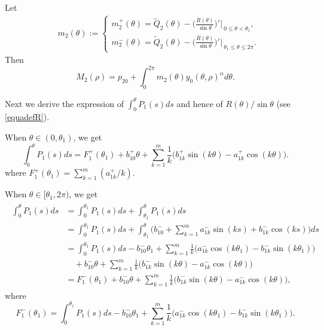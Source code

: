 \documentclass[11pt]{amsart}
\theoremstyle{remark}
\theoremstyle{definition}
\begin{document}
Let  \begin{align}\label{m2}
&m_2(\theta):=
\left\{
\begin{aligned}
m_2^+(\theta)=\tilde{Q}_2(\theta)- \bigg(\frac{R(\theta)}{\sin \theta}\bigg)'\bigg|_{\ 0 \le  \theta <  \theta_{1}},   \\
m_2^-(\theta)=\tilde{Q}_2(\theta)- \bigg(\frac{R(\theta)}{\sin \theta}\bigg)'\bigg|_{\  \theta_{1} \leq \theta \le 2\pi}.
\end{aligned}
\right.
\end{align}
Then
\begin{equation} \label{equa10-1}
M_{2}(\rho)=p_{20}+ \int_{0}^{2\pi}m_2(\theta)y_0(\theta,\rho)^{\alpha}d \theta. \end{equation}







Next we derive the expression of $\int_{0}^{\theta}P_1(s)ds$ and hence of ${R(\theta)}/{\sin \theta}$ (see \eqref{equadefR}).


 When $\theta \in (0, \theta_1)$,   we get
\begin{equation*}\label{equa13}
\int_{0}^{\theta}P_1(s)ds
={F}_1^+(\theta_1)+b_{10}^+\theta+\sum_{k=1}^{m}\frac{1}{k}\bigg(b_{1k}^+\sin (k\theta)-a_{1k}^+\cos (k\theta)\bigg).
\end{equation*}
where ${F}_1^+(\theta_1)=\sum_{k=1}^{m}\left({a_{1k}^+}/{k}\right).$

When  $\theta \in [\theta_1, 2\pi)$,   we get
\begin{align} \label{equa14}
\begin{split}
\int_{0}^{\theta}P_1(s)ds&=\int_{0}^{\theta_1}P_1(s)ds+\int_{\theta_1}^{\theta}P_1(s)ds\\
&=\int_{0}^{\theta_1}P_1(s)ds+\int_{\theta_1}^{\theta}\bigg(b_{10}^-+\sum_{k=1}^{m}a_{1k}^-\sin (ks)+b_{1k}^-\cos (ks)\bigg)ds\\
&=\int_{0}^{\theta_1}P_1(s)ds-b_{10}^-\theta_1+\sum_{k=1}^{m}\frac{1}{k}\big(a_{1k}^-\cos (k\theta_1)-b_{1k}^-\sin (k\theta_1)\big)\\
&\quad + b_{10}^-\theta+\sum_{k=1}^{m}\frac{1}{k}\big(b_{1k}^-\sin (k\theta)-a_{1k}^-\cos (k\theta)\big)  \\
&={F}_1^-(\theta_1) + b_{10}^-\theta+\sum_{k=1}^{m}\frac{1}{k}\big(b_{1k}^-\sin (k\theta)-a_{1k}^-\cos (k\theta)\big),
\end{split}\nonumber
\end{align}
where $$ {F}_1^-(\theta_1)=\int_{0}^{\theta_1}P_1(s)ds-b_{10}^-\theta_1+\sum_{k=1}^{m}\frac{1}{k}\big(a_{1k}^-\cos (k\theta_1)-b_{1k}^-\sin (k\theta_1)\big).$$
\end{document}
